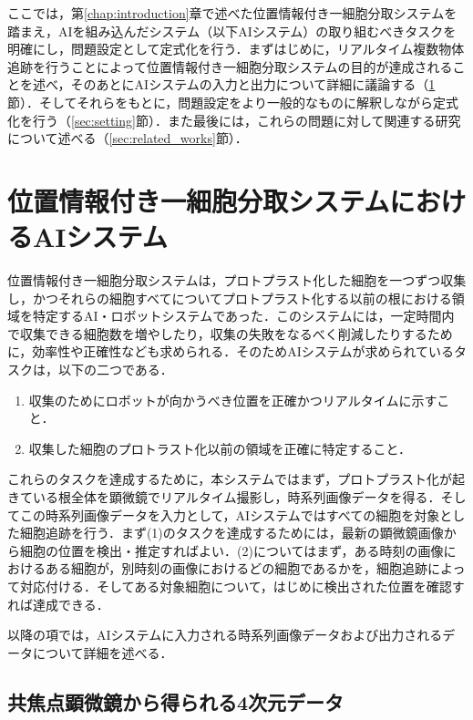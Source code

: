 \thispagestyle{fancy2}

ここでは，第\ref{chap:introduction}章で述べた位置情報付き一細胞分取システムを踏まえ，AIを組み込んだシステム（以下AIシステム）の取り組むべきタスクを明確にし，問題設定として定式化を行う．まずはじめに，リアルタイム複数物体追跡を行うことによって位置情報付き一細胞分取システムの目的が達成されることを述べ，そのあとにAIシステムの入力と出力について詳細に議論する（\ref{sec:ai_system}節）．そしてそれらをもとに，問題設定をより一般的なものに解釈しながら定式化を行う（\ref{sec:setting}節）．また最後には，これらの問題に対して関連する研究について述べる（\ref{sec:related_works}節）．

\section{位置情報付き一細胞分取システムにおけるAIシステム}

\label{sec:ai_system}
位置情報付き一細胞分取システムは，プロトプラスト化した細胞を一つずつ収集し，かつそれらの細胞すべてについてプロトプラスト化する以前の根における領域を特定するAI・ロボットシステムであった．このシステムには，一定時間内で収集できる細胞数を増やしたり，収集の失敗をなるべく削減したりするために，効率性や正確性なども求められる．そのためAIシステムが求められているタスクは，以下の二つである．
\begin{enumerate}[label=(\arabic*)]
    \item 収集のためにロボットが向かうべき位置を正確かつリアルタイムに示すこと．
    \item 収集した細胞のプロトラスト化以前の領域を正確に特定すること．
\end{enumerate}

これらのタスクを達成するために，本システムではまず，プロトプラスト化が起きている根全体を顕微鏡でリアルタイム撮影し，時系列画像データを得る．そしてこの時系列画像データを入力として，AIシステムではすべての細胞を対象とした細胞追跡を行う．まず(1)のタスクを達成するためには，最新の顕微鏡画像から細胞の位置を検出・推定すればよい．(2)についてはまず，ある時刻の画像におけるある細胞が，別時刻の画像におけるどの細胞であるかを，細胞追跡によって対応付ける．そしてある対象細胞について，はじめに検出された位置を確認すれば達成できる．

以降の項では，AIシステムに入力される時系列画像データおよび出力されるデータについて詳細を述べる．

    \subsection{共焦点顕微鏡から得られる4次元データ}
    \label{subsec:input_from_confocal_microscope}

